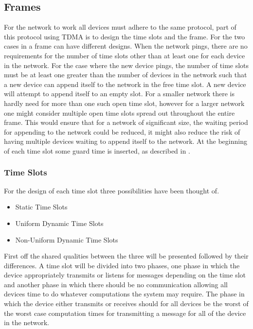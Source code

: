 \subsection{Frames}
For the network to work all devices must adhere to the same protocol, part of this protocol using TDMA is to design the time slots and the frame.
For the two cases in  a frame can have different designs.
When the network pings, there are no requirements for the number of time slots other than at least one for each device in the network.
For the case where the new device pings, the number of time slots must be at least one greater than the number of devices in the network such that a new device can append itself to the network in the free time slot.
A new device will attempt to append itself to an empty slot.
For a smaller network there is hardly need for more than one such open time slot, however for a larger network one might consider multiple open time slots spread out throughout the entire frame.
This would ensure that for a network of significant size, the waiting period for appending to the network could be reduced, it might also reduce the risk of having multiple devices waiting to append itself to the network.
At the beginning of each time slot some guard time is inserted, as described in .

\subsubsection{Time Slots}
For the design of each time slot three possibilities have been thought of.
\begin{itemize}
    \item Static Time Slots
    \item Uniform Dynamic Time Slots
    \item Non-Uniform Dynamic Time Slots
\end{itemize}
First off the shared qualities between the three will be presented followed by their differences.
A time slot will be divided into two phases, one phase in which the device appropriately transmits or listens for messages depending on the time slot and another phase in which there should be no communication allowing all devices time to do whatever computations the system may require.
The phase in which the device either transmits or receives should for all devices be the worst of the worst case computation times for transmitting a message for all of the device in the network.

